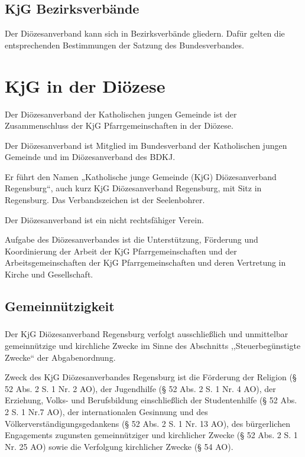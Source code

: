 \documentclass[12pt]{report}
\newcommand{\nocontentsline}[3]{}
\newcommand{\tocless}[2]{\bgroup\let\addcontentsline=\nocontentsline#1{#2}\egroup}
\begin{document}
\begin{justify}
\section{KjG Bezirksverbände}
Der Diözesanverband kann sich in Bezirksverbände gliedern. Dafür gelten die entsprechenden
Bestimmungen der Satzung des Bundesverbandes.
\chapter{KjG in der Diözese}
Der Diözesanverband der Katholischen jungen Gemeinde ist der Zusammenschluss der
KjG Pfarrgemeinschaften in der Diözese.

Der Diözesanverband ist Mitglied im Bundesverband der Katholischen jungen Gemeinde und im
Diözesanverband des BDKJ.

Er führt den Namen „Katholische junge Gemeinde (KjG) Diözesanverband Regensburg“,
auch kurz KjG Diözesanverband Regensburg, mit Sitz in Regensburg.
Das Verbandszeichen ist der Seelenbohrer.

Der Diözesanverband ist ein nicht rechtsfähiger Verein.

Aufgabe des Diözesanverbandes ist die Unterstützung, Förderung und Koordinierung der Arbeit
der KjG Pfarrgemeinschaften und der Arbeitsgemeinschaften der KjG Pfarrgemeinschaften und
deren Vertretung in Kirche und Gesellschaft.

\section{Gemeinnützigkeit}

\tocless\subsection{}
Der KjG Diözesanverband Regensburg verfolgt ausschließlich und unmittelbar gemeinnützige
und kirchliche Zwecke im Sinne des Abschnitts ,,Steuerbegünstigte Zwecke`` der Abgabenordnung.

\tocless\subsection{}
\label{subsec:Zweck}
Zweck des KjG Diözesanverbandes Regensburg ist die
Förderung der Religion (§ 52 Abs. 2 S. 1 Nr. 2 AO),
der Jugendhilfe (§ 52 Abs. 2 S. 1 Nr. 4 AO),
der Erziehung, Volks- und Berufsbildung einschließlich
der Studentenhilfe (§ 52 Abs. 2 S. 1 Nr.7 AO), der internationalen Gesinnung
und des Völkerverständigungsgedankens (§ 52 Abs. 2 S. 1 Nr. 13 AO), des
bürgerlichen Engagements zugunsten gemeinnütziger und kirchlicher Zwecke
(§ 52 Abs. 2 S. 1 Nr. 25 AO) sowie die Verfolgung kirchlicher Zwecke (§ 54 AO).


\end{justify}
\end{document}
